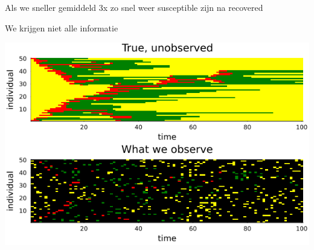 \documentclass{beamer}
\begin{document}
\begin{frame}{Als we sneller gemiddeld 3x zo snel weer susceptible zijn na recovered}

	
\end{frame}


\begin{frame}{We krijgen niet alle informatie}

\includegraphics[scale=0.5]{large_example_forw_and_observe.png}
	
\end{frame}
	
\end{document}
